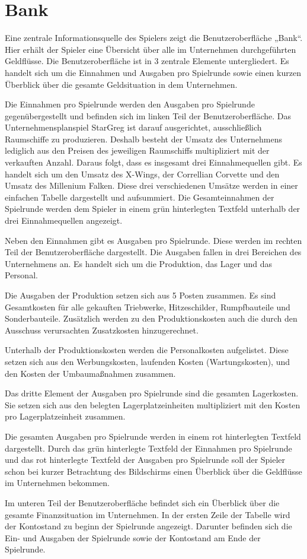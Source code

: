 \section{Bank}
\label{sec:ui-bank}

Eine zentrale Informationsquelle des Spielers zeigt die Benutzeroberfläche „Bank“. Hier erhält der Spieler eine Übersicht über alle im Unternehmen durchgeführten Geldflüsse. Die Benutzeroberfläche ist in 3 zentrale Elemente untergliedert. Es handelt sich um die Einnahmen und Ausgaben pro Spielrunde sowie einen kurzen Überblick über die gesamte Geldsituation in dem Unternehmen.
 
Die Einnahmen pro Spielrunde werden den Ausgaben pro Spielrunde gegenübergestellt und befinden sich im linken Teil der Benutzeroberfläche. Das Unternehmensplanspiel StarGreg ist darauf ausgerichtet, ausschließlich Raumschiffe zu produzieren. Deshalb besteht der Umsatz des Unternehmens lediglich aus den Preisen des jeweiligen Raumschiffs multipliziert mit der verkauften Anzahl. Daraus folgt, dass es insgesamt drei Einnahmequellen gibt. Es handelt sich um den Umsatz des X-Wings, der Correllian Corvette und den Umsatz des Millenium Falken. Diese drei verschiedenen Umsätze werden in einer einfachen Tabelle dargestellt und aufsummiert. Die Gesamteinnahmen der Spielrunde werden dem Spieler in einem grün hinterlegten Textfeld unterhalb der drei Einnahmequellen angezeigt.
 
Neben den Einnahmen gibt es Ausgaben pro Spielrunde. Diese werden im rechten Teil der Benutzeroberfläche dargestellt. Die Ausgaben fallen in drei Bereichen des Unternehmens an. Es handelt sich um die Produktion, das Lager und das Personal.
 
Die Ausgaben der Produktion setzen sich aus 5 Posten zusammen. Es sind Gesamtkosten für alle gekauften Triebwerke, Hitzeschilder, Rumpfbauteile und Sonderbauteile. Zusätzlich werden zu den Produktionskosten auch die durch den Ausschuss verursachten  Zusatzkosten hinzugerechnet.
 
Unterhalb der Produktionskosten werden die Personalkosten aufgelistet. Diese setzen sich aus den Werbungskosten, laufenden Kosten (Wartungskosten), und den Kosten der Umbaumaßnahmen zusammen.
 
Das dritte Element der Ausgaben pro Spielrunde sind die gesamten Lagerkosten. Sie setzen sich aus den belegten Lagerplatzeinheiten multipliziert mit den Kosten pro Lagerplatzeinheit zusammen.
 
Die gesamten Ausgaben pro Spielrunde werden in einem rot hinterlegten Textfeld dargestellt. Durch das grün hinterlegte Textfeld der Einnahmen pro Spielrunde und das rot hinterlegte Textfeld der Ausgaben pro Spielrunde soll der Spieler schon bei kurzer Betrachtung des Bildschirms einen Überblick über die Geldflüsse im Unternehmen bekommen.
 
 
Im unteren Teil der Benutzeroberfläche befindet sich ein Überblick über die gesamte Finanzsituation im Unternehmen. In der ersten Zeile der Tabelle wird der Kontostand zu beginn der Spielrunde angezeigt. Darunter befinden sich die Ein- und Ausgaben der Spielrunde sowie der Kontostand am Ende der Spielrunde. 


\autorende{}